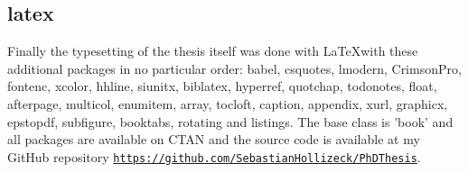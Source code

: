 {\subsection*{latex}
Finally the typesetting of the thesis itself was done with \LaTeX with these additional packages in no particular order: babel, csquotes, lmodern, CrimsonPro, fontenc, xcolor, hhline, siunitx, biblatex, hyperref, quotchap, todonotes, float, afterpage, multicol, enumitem, array, tocloft, caption, appendix, xurl, graphicx, epstopdf, subfigure, booktabs, rotating and listings. 
The base class is 'book' and all packages are available on CTAN and the source code is available at my GitHub repository \href{https://github.com/SebastianHollizeck/PhDThesis}{\nolinkurl{https://github.com/SebastianHollizeck/PhDThesis}}.

}

